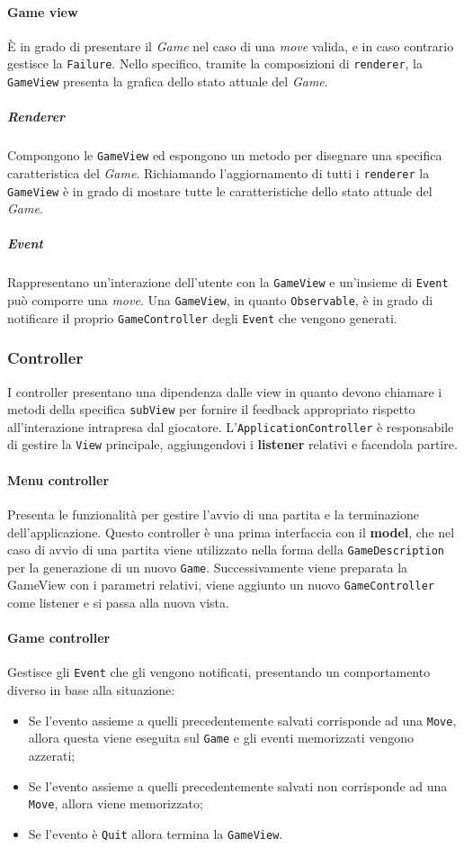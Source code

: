 \paragraph{Game view} 
%
È in grado di presentare il \textit{Game} nel caso di una \textit{move} valida, e in caso contrario gestisce la \texttt{Failure}.
%
Nello specifico, tramite la composizioni di \texttt{renderer}, la \texttt{GameView} presenta la grafica dello stato attuale del \textit{Game}.
\subparagraph{Renderer}
%
Compongono le \texttt{GameView} ed espongono un metodo per disegnare una specifica caratteristica del \textit{Game}.
%
Richiamando l'aggiornamento di tutti i \texttt{renderer} la \texttt{GameView} è in grado di mostare tutte le caratteristiche dello stato attuale del \textit{Game}.
\subparagraph{Event}
%
Rappresentano un'interazione dell'utente con la \texttt{GameView} e un'insieme di \texttt{Event} può comporre una \textit{move}.%
%
Una \texttt{GameView}, in quanto \texttt{Observable}, è in grado di notificare il proprio \texttt{GameController} degli \texttt{Event} che vengono generati. 
\subsubsection{Controller}
I controller presentano una dipendenza dalle view in quanto devono chiamare i metodi della specifica \texttt{subView} per fornire il feedback appropriato rispetto all'interazione intrapresa dal giocatore.
%
L'\texttt{ApplicationController} è responsabile di gestire la \texttt{View} principale, aggiungendovi i \textbf{listener} relativi e facendola partire.
\paragraph{Menu controller}
%
Presenta le funzionalità per gestire l'avvio di una partita e la terminazione dell'applicazione.
%
Questo controller è una prima interfaccia con il \textbf{model}, che nel caso di avvio di una partita viene utilizzato nella forma della \texttt{GameDescription} per la generazione di un nuovo \texttt{Game}.
%
Successivamente viene preparata la GameView con i parametri relativi, viene aggiunto un nuovo \texttt{GameController} come listener e si passa alla nuova vista.
\paragraph{Game controller}
%
Gestisce gli \texttt{Event} che gli vengono notificati, presentando un comportamento diverso in base alla situazione:
\begin{itemize}
    \item Se l'evento assieme a quelli precedentemente salvati corrisponde ad una \texttt{Move}, allora questa viene eseguita sul \texttt{Game} e gli eventi memorizzati vengono azzerati;
    \item Se l'evento assieme a quelli precedentemente salvati non corrisponde ad una \texttt{Move}, allora viene memorizzato;
    \item Se l'evento è \texttt{Quit} allora termina la \texttt{GameView}.
\end{itemize}
